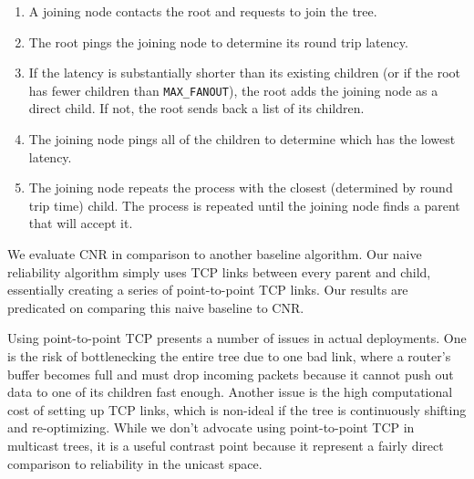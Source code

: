 \begin{enumerate}  
	\item A joining node contacts the root and requests to join the tree. 
	\item The root pings the joining node to determine its round trip latency. 
	\item If the latency is substantially shorter than its existing children (or if the root has fewer children than \texttt{MAX\_FANOUT}), the root adds the joining node as a direct child. If not, the root sends back a list of its children.
	\item The joining node pings all of the children to determine which has the lowest latency.
	\item The joining node repeats the process with the closest (determined by round trip time) child. The process is repeated until the joining node finds a parent that will accept it.
\end{enumerate}

We evaluate CNR in comparison to another baseline algorithm. Our naive reliability algorithm simply uses TCP links between every parent and child, essentially creating a series of point-to-point TCP links. Our results are predicated on comparing this naive baseline to CNR. 

Using point-to-point TCP presents a number of issues in actual deployments. One is the risk of bottlenecking the entire tree due to one bad link, where a router's buffer becomes full and must drop incoming packets because it cannot push out data to one of its children fast enough. Another issue is the high computational cost of setting up TCP links, which is non-ideal if the tree is continuously shifting and re-optimizing. While we don't advocate using point-to-point TCP in multicast trees, it is a useful contrast point because it represent a fairly direct comparison to reliability in the unicast space.